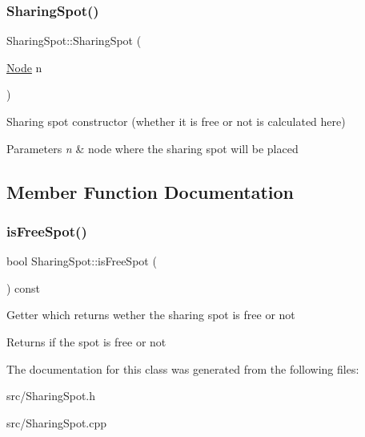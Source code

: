 \subsubsection{\texorpdfstring{Sharing\+Spot()}{SharingSpot()}}
{\footnotesize\ttfamily Sharing\+Spot\+::\+Sharing\+Spot (\begin{DoxyParamCaption}\item[{\mbox{\hyperlink{class_node}{Node}}}]{n }\end{DoxyParamCaption})\hspace{0.3cm}{\ttfamily [explicit]}}

Sharing spot constructor (whether it is free or not is calculated here) 
\begin{DoxyParams}{Parameters}
{\em n} & node where the sharing spot will be placed \\
\hline
\end{DoxyParams}


\subsection{Member Function Documentation}
\mbox{\label{class_sharing_spot_a6b565d3a7fb62fb3235794a8381f9873}} 
\subsubsection{\texorpdfstring{is\+Free\+Spot()}{isFreeSpot()}}
{\footnotesize\ttfamily bool Sharing\+Spot\+::is\+Free\+Spot (\begin{DoxyParamCaption}{ }\end{DoxyParamCaption}) const}

Getter which returns wether the sharing spot is free or not \begin{DoxyReturn}{Returns}
if the spot is free or not 
\end{DoxyReturn}


The documentation for this class was generated from the following files\+:\begin{DoxyCompactItemize}
\item 
src/Sharing\+Spot.\+h\item 
src/Sharing\+Spot.\+cpp\end{DoxyCompactItemize}
